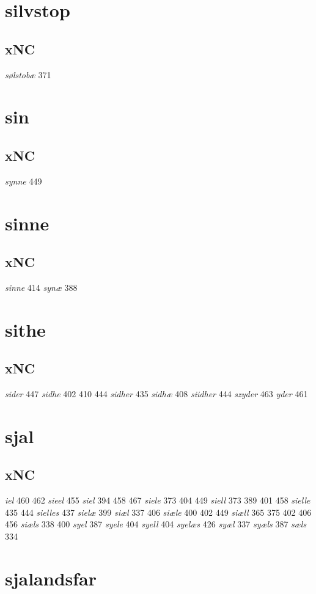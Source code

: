 \documentclass[a4paper,twocolumn]{article}
\begin{document}
\section{silvstop}
\label{sec:orgf8e3ecc}
\subsection{xNC}
\label{sec:orgeb8b4b3}
\emph{sølstobæ} 371 
\section{sin}
\label{sec:org3df8707}
\subsection{xNC}
\label{sec:org3e4391d}
\emph{synne} 449 
\section{sinne}
\label{sec:org6e116e3}
\subsection{xNC}
\label{sec:org17c3f87}
\emph{sinne} 414 \emph{synæ} 388 
\section{sithe}
\label{sec:orga1bf89f}
\subsection{xNC}
\label{sec:org94faac7}
\emph{sider} 447 \emph{sidhe} 402 410 444 \emph{sidher} 435 \emph{sidhæ} 408 \emph{siidher} 444 \emph{szyder} 463 \emph{yder} 461 
\section{sjal}
\label{sec:org2fc00e8}
\subsection{xNC}
\label{sec:orgfcac570}
\emph{iel} 460 462 \emph{sieel} 455 \emph{siel} 394 458 467 \emph{siele} 373 404 449 \emph{siell} 373 389 401 458 \emph{sielle} 435 444 \emph{sielles} 437 \emph{sielæ} 399 \emph{siæl} 337 406 \emph{siæle} 400 402 449 \emph{siæll} 365 375 402 406 456 \emph{siæls} 338 400 \emph{syel} 387 \emph{syele} 404 \emph{syell} 404 \emph{syelæs} 426 \emph{syæl} 337 \emph{syæls} 387 \emph{sæls} 334 
\section{sjalandsfar}
\label{sec:org6c71eb5}
\end{document}
